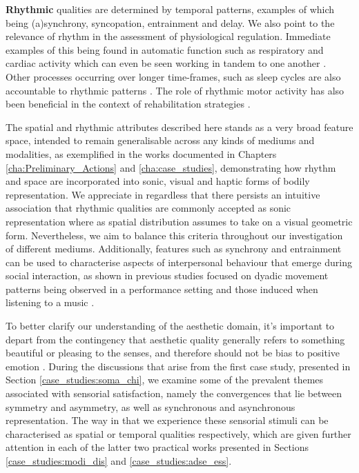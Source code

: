 \textbf{Rhythmic} qualities are determined by temporal patterns, examples of which being (a)synchrony, syncopation, entrainment and delay. We also point to the relevance of rhythm in the assessment of physiological regulation. Immediate examples of this being found in automatic function such as respiratory and cardiac activity \cite{moser_phase_1995} which can even be seen working in tandem to one another \cite{scholkmann_pulse-respiration_2019}. Other processes occurring over longer time-frames, such as sleep cycles are also accountable to rhythmic patterns \cite{moser_why_2006}. The role of rhythmic motor activity has also been beneficial in the context of rehabilitation strategies \cite{fujii_role_2014}.

The spatial and rhythmic attributes described here stands as a very broad feature space, intended to remain generalisable across any kinds of mediums and modalities, as exemplified in the works documented in Chapters \ref{cha:Preliminary_Actions} and \ref{cha:case_studies}, demonstrating how rhythm and space are incorporated into sonic, visual and haptic forms of bodily representation. We appreciate in regardless that there persists an intuitive association that rhythmic qualities are commonly accepted as sonic representation where as spatial distribution assumes to take on a visual geometric form. Nevertheless, we aim to balance this criteria throughout our investigation of different mediums. Additionally, features such as synchrony and entrainment can be used to characterise aspects of interpersonal behaviour that emerge during social interaction, as shown in previous studies focused on dyadic movement patterns being observed in a performance setting \cite{ward_sensing_2018} and those induced when listening to a music \cite{scurto_entrain_2019,danielsen_moving_2015}.

To better clarify our understanding of the aesthetic domain, it’s important to depart from the contingency that aesthetic quality generally refers to something beautiful or pleasing to the senses, and therefore should not be bias to positive emotion \cite{fingerhut_aesthetic_2020}. During the discussions that arise from the first case study, presented in Section \ref{case_studies:soma_chi}, we examine some of the prevalent themes associated with sensorial satisfaction, namely the convergences that lie between symmetry and asymmetry, as well as synchronous and asynchronous representation. The way in that we experience these sensorial stimuli can be characterised as spatial or temporal qualities respectively, which are given further attention in each of the latter two practical works presented in Sections \ref{case_studies:modi_dis} and \ref{case_studies:adse_ess}.
